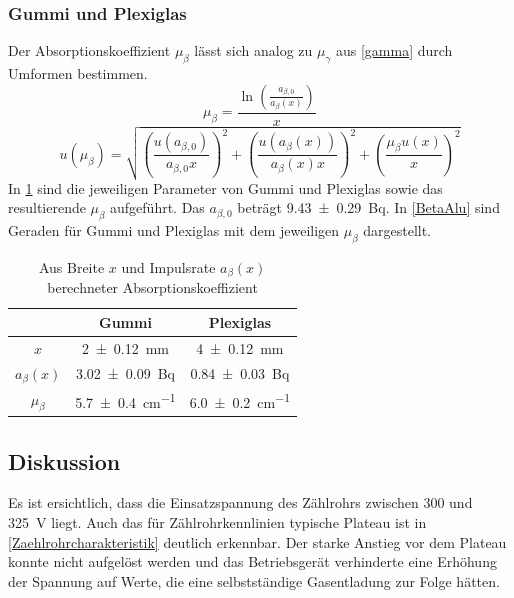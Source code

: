 \documentclass[
	a4paper,
	12pt,
	pagesize,
	ngerman
]{scrartcl}
\begin{document}
	\subsubsection*{Gummi und Plexiglas} 
	Der Absorptionskoeffizient $\mu_\beta$ lässt sich analog zu $\mu_\gamma$ aus \cref{gamma} durch Umformen bestimmen.
	\begin{equation}
		\mu_\beta = \frac{\ln \left( \frac{a_{\beta,0}}{a_\beta(x)}\right)}{x}
	\end{equation}
	\begin{equation}
	u(\mu_\beta) = \sqrt{ \left(\frac{u(a_{\beta,0})}{a_{\beta,0}x}\right)^2 + \left(\frac{u(a_\beta(x))}{a_\beta(x)x}\right)^2 + \left(\frac{\mu_\beta u(x)}{x}\right)^2}
	\end{equation}
	In \cref{TabelleMu} sind die jeweiligen Parameter von Gummi und Plexiglas sowie das resultierende $\mu_\beta$ aufgeführt.
	Das $a_{\beta,0}$ beträgt \SI{9,43 +- 0,29}{Bq}.
	In \cref{BetaAlu} sind Geraden für Gummi und Plexiglas mit dem jeweiligen $\mu_\beta$ dargestellt.
	\begin{table}[H]
		\centering
		\begin{tabular}{ c | c | c }
			&Gummi & Plexiglas \\ \hline
			$x$&\SI{2+-0,12}{mm}&\SI{4+-0,12}{mm}\\
			$a_\beta(x)$&\SI{3,02+-0,09}{Bq}&\SI{0,84+-0,03}{Bq}\\
			$\mu_\beta$&\SI{5,7+-0,4}{cm^{-1}}&\SI{6,0+-0,2}{cm^{-1}}\\
			
		\end{tabular}
		\caption{Aus Breite $x$ und Impulsrate $a_\beta(x)$ berechneter Absorptionskoeffizient}
		\label{TabelleMu} 
	\end{table}
	
	\subsection{Diskussion}
	Es ist ersichtlich, dass die Einsatzspannung des Zählrohrs zwischen 300 und \SI{325}{V} liegt. %
	Auch das für Zählrohrkennlinien typische Plateau ist in \cref{Zaehlrohrcharakteristik} deutlich erkennbar.
	Der starke Anstieg vor dem Plateau konnte nicht aufgelöst werden und das Betriebsgerät verhinderte eine Erhöhung der Spannung auf Werte, die eine selbstständige Gasentladung zur Folge hätten.
	
\end{document}
